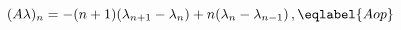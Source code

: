 \begin{equation}
(A\lambda)_n = -(n+1)(\lambda_{n+1}-\lambda_n) + n(\lambda_n-\lambda_{n-1})\,,
\eqlabel{Aop}
\end{equation}

